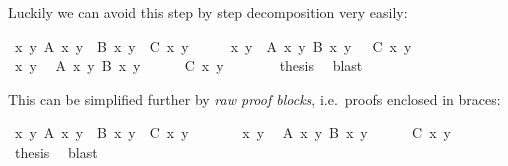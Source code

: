 \begin{isabellebody}
\begin{isamarkuptext}
Luckily we can avoid this step by step decomposition very easily:%
\end{isamarkuptext}%
\isamarkupfalse%
\ {\isachardoublequote}{\isasymforall}x\ y{\isachardot}\ A\ x\ y\ {\isasymand}\ B\ x\ y\ {\isasymlongrightarrow}\ C\ x\ y{\isachardoublequote}\isanewline
%
\isadelimproof
%
\endisadelimproof
%
\isatagproof
\isamarkupfalse%
\ {\isacharminus}\isanewline
\ \ \isamarkupfalse%
\ {\isachardoublequote}{\isasymAnd}x\ y{\isachardot}\ {\isasymlbrakk}\ A\ x\ y{\isacharsemicolon}\ B\ x\ y\ {\isasymrbrakk}\ {\isasymLongrightarrow}\ C\ x\ y{\isachardoublequote}\isanewline
\ \ \isamarkupfalse%
\ {\isacharminus}\isanewline
\ \ \ \ \isamarkupfalse%
\ x\ y\ \isamarkupfalse%
\ {\isachardoublequote}A\ x\ y{\isachardoublequote}\ {\isachardoublequote}B\ x\ y{\isachardoublequote}\isanewline
\ \ \ \ \isamarkupfalse%
\ {\isachardoublequote}C\ x\ y{\isachardoublequote}\ \isamarkupfalse%
\isanewline
\ \ \isamarkupfalse%
\isanewline
\ \ \isamarkupfalse%
\ {\isacharquery}thesis\ \isamarkupfalse%
\ blast\isanewline
\isamarkupfalse%
%
\endisatagproof
{\isafoldproof}%
%
\isadelimproof
%
\endisadelimproof
\isamarkuptrue%
%
\begin{isamarkuptext}%
\noindent
This can be simplified further by \emph{raw proof blocks}, i.e.\
proofs enclosed in braces:%
\end{isamarkuptext}%
\isamarkupfalse%
\ {\isachardoublequote}{\isasymforall}x\ y{\isachardot}\ A\ x\ y\ {\isasymand}\ B\ x\ y\ {\isasymlongrightarrow}\ C\ x\ y{\isachardoublequote}\isanewline
%
\isadelimproof
%
\endisadelimproof
%
\isatagproof
\isamarkupfalse%
\ {\isacharminus}\isanewline
\ \ \isamarkupfalse%
\isacommand{{\isacharbraceleft}}\ \isamarkupfalse%
\ x\ y\ \isamarkupfalse%
\ {\isachardoublequote}A\ x\ y{\isachardoublequote}\ {\isachardoublequote}B\ x\ y{\isachardoublequote}\isanewline
\ \ \ \ \isamarkupfalse%
\ {\isachardoublequote}C\ x\ y{\isachardoublequote}\ \isamarkupfalse%
\isacommand{sorry}\ \isamarkupfalse%
\isacommand{{\isacharbraceright}}\isanewline
\ \ \isamarkupfalse%
\ {\isacharquery}thesis\ \isamarkupfalse%
\ blast\isanewline
\isamarkupfalse%
%
\endisatagproof
{\isafoldproof}%
%
\isadelimproof
%
\endisadelimproof
\isamarkuptrue%
%
\begin{isamarkuptext}%

\end{isamarkuptext}
\end{isabellebody}
